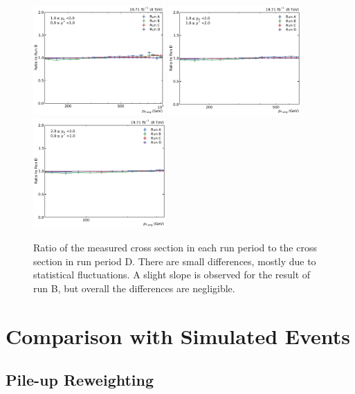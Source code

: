 \begin{figure}[htbp]
    \includegraphics[width=0.45\textwidth]{figures/measurement/run_comparison_yb1ys0.pdf}
    \includegraphics[width=0.45\textwidth]{figures/measurement/run_comparison_yb1ys1.pdf}\hfill
    \includegraphics[width=0.45\textwidth]{figures/measurement/run_comparison_yb2ys0.pdf}
    \caption[Stability of result over all run periods]{Ratio of the measured
    cross section in each run period to the cross section in run period D. There
    are small differences, mostly due to statistical fluctuations. A slight slope is
    observed for the result of run B, but overall the differences are negligible.}
    \label{fig:run_comparison}
\end{figure}

\section{Comparison with Simulated Events}
\label{sec:simulated_events}

\subsection{Pile-up Reweighting}

